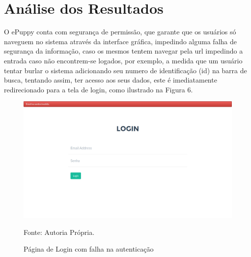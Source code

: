 \section{Análise dos Resultados}

O ePuppy conta com segurança de permissão, que garante que os usuários só naveguem no sistema através da interface gráfica, impedindo alguma falha de segurança da informação, caso os mesmos tentem navegar pela url impedindo a entrada caso não encontrem-se logados, por exemplo, a medida que um usuário tentar burlar o sistema adicionando seu numero de identificação (id) na barra de busca, tentando assim, ter acesso aos seus dados, este é imediatamente redirecionado para a tela de login, como ilustrado na Figura 6.

\begin{figure}[h!]
	\center	\includegraphics[scale=0.30
	]{imagens/errologin}
	\caption{Página de Login com falha na autenticação}
	Fonte: Autoria Própria.
	\label{Rotulo}
\end{figure}


